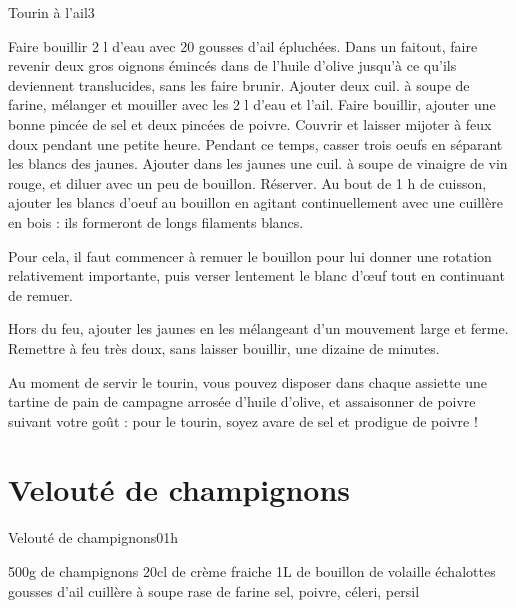 {\begin{recette}{Tourin à l'ail}{3}{}{}
\begin{preparation}
\etape Faire bouillir 2 l d'eau avec 20 gousses d'ail épluchées.
\etape Dans un faitout, faire revenir deux gros oignons émincés dans de l'huile d'olive jusqu'à ce qu'ils deviennent 
translucides, sans les faire brunir.
\etape Ajouter deux cuil. à soupe de farine, mélanger et mouiller avec les 2 l d'eau et l'ail.
\etape Faire bouillir, ajouter une bonne pincée de sel et deux pincées de poivre.
\etape Couvrir et laisser mijoter à feux doux pendant une petite heure.
\etape Pendant ce temps, casser trois oeufs en séparant les blancs des jaunes.
\etape Ajouter dans les jaunes une cuil. à soupe de vinaigre de vin rouge, et diluer avec un peu de bouillon. Réserver.
\etape Au bout de 1 h de cuisson, ajouter les blancs d'oeuf au bouillon en agitant continuellement avec une cuillère en bois : 
ils formeront de longs filaments blancs.
\begin{remarque}
Pour cela, il faut commencer à remuer le bouillon pour lui donner une rotation relativement importante, puis verser lentement le 
blanc d'œuf tout en continuant de remuer.
\end{remarque}
\etape Hors du feu, ajouter les jaunes en les mélangeant d'un mouvement large et ferme.
\etape Remettre à feu très doux, sans laisser bouillir, une dizaine de minutes.
\end{preparation}

\begin{remarque}
Au moment de servir le tourin, vous pouvez disposer dans chaque assiette une tartine de pain de campagne arrosée d'huile 
d'olive, et assaisonner de poivre suivant votre goût : pour le tourin, soyez avare de sel et prodigue de poivre !
\end{remarque}
\end{recette}

\section{Velouté de champignons}
\begin{recette}{Velouté de champignons}{0}{1h}{}
\begin{ingredients}
\ingredient 500g de champignons
\ingredient 20cl de crème fraiche
\ingredient 1L de bouillon de volaille
 échalottes
 gousses d'ail
 cuillère à soupe rase de farine
\ingredient sel, poivre, céleri, persil
\end{ingredients}


\end{recette}}
